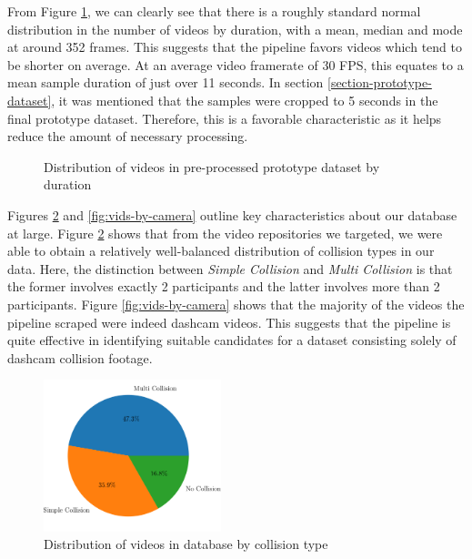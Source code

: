 \documentclass[letterpaper, 10 pt, conference]{ieeeconf}
\begin{document}
From Figure \ref{fig:vids-by-duration}, we can clearly see that there is a roughly standard normal distribution in the number of videos by duration, with a mean, median and mode at around 352 frames. This suggests that the pipeline favors videos which tend to be shorter on average. At an average video framerate of 30 FPS, this equates to a mean sample duration of just over 11 seconds. In section \ref{section-prototype-dataset}, it was mentioned that the samples were cropped to 5 seconds in the final prototype dataset. Therefore, this is a favorable characteristic as it helps reduce the amount of necessary processing.

\begin{figure}[!h]
    \centering
    \caption{Distribution of videos in pre-processed prototype dataset by duration}
    \label{fig:vids-by-duration}
\end{figure}

Figures \ref{fig:vids-by-collision} and \ref{fig:vids-by-camera} outline key characteristics about our database at large. Figure \ref{fig:vids-by-collision} shows that from the video repositories we targeted, we were able to obtain a relatively well-balanced distribution of collision types in our data. Here, the distinction between \textit{Simple Collision} and \textit{Multi Collision} is that the former involves exactly 2 participants and the latter involves more than 2 participants. Figure \ref{fig:vids-by-camera} shows that the majority of the videos the pipeline scraped were indeed dashcam videos. This suggests that the pipeline is quite effective in identifying suitable candidates for a  dataset consisting solely of dashcam collision footage.

\begin{figure}[!h]
    \centering
    \includegraphics[width=0.46\textwidth,trim={0 1cm 0 0},clip]{by-collision.png}
    \caption{Distribution of videos in database by collision type}
    \label{fig:vids-by-collision}
\end{figure}
\end{document}
